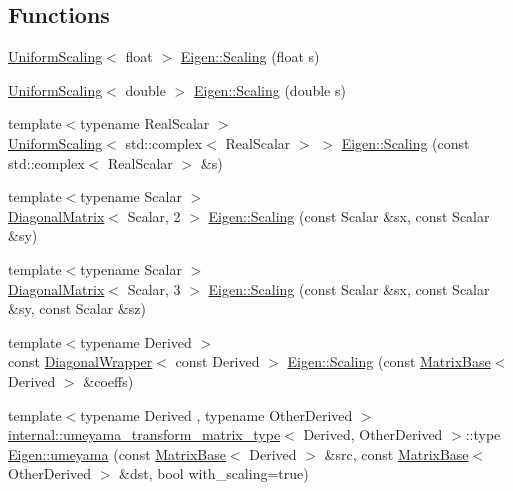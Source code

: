 \subsection*{Functions}
\begin{DoxyCompactItemize}
\item 
\mbox{\hyperlink{class_eigen_1_1_uniform_scaling}{Uniform\+Scaling}}$<$ float $>$ \mbox{\hyperlink{group___geometry___module_ga02918175ff75e5df9fd291cf5fc3fd1b}{Eigen\+::\+Scaling}} (float s)
\item 
\mbox{\hyperlink{class_eigen_1_1_uniform_scaling}{Uniform\+Scaling}}$<$ double $>$ \mbox{\hyperlink{group___geometry___module_gad2e71727718ca788680b3aa9eb485f98}{Eigen\+::\+Scaling}} (double s)
\item 
{\footnotesize template$<$typename Real\+Scalar $>$ }\\\mbox{\hyperlink{class_eigen_1_1_uniform_scaling}{Uniform\+Scaling}}$<$ std\+::complex$<$ Real\+Scalar $>$ $>$ \mbox{\hyperlink{group___geometry___module_ga76386154f2cdb77190759744830422d1}{Eigen\+::\+Scaling}} (const std\+::complex$<$ Real\+Scalar $>$ \&s)
\item 
{\footnotesize template$<$typename Scalar $>$ }\\\mbox{\hyperlink{class_eigen_1_1_diagonal_matrix}{Diagonal\+Matrix}}$<$ Scalar, 2 $>$ \mbox{\hyperlink{group___geometry___module_gaafd4d881e7a6c2a68c1db03e261c767b}{Eigen\+::\+Scaling}} (const Scalar \&sx, const Scalar \&sy)
\item 
{\footnotesize template$<$typename Scalar $>$ }\\\mbox{\hyperlink{class_eigen_1_1_diagonal_matrix}{Diagonal\+Matrix}}$<$ Scalar, 3 $>$ \mbox{\hyperlink{group___geometry___module_ga162d759175d7c5214f33fefb30862815}{Eigen\+::\+Scaling}} (const Scalar \&sx, const Scalar \&sy, const Scalar \&sz)
\item 
{\footnotesize template$<$typename Derived $>$ }\\const \mbox{\hyperlink{class_eigen_1_1_diagonal_wrapper}{Diagonal\+Wrapper}}$<$ const Derived $>$ \mbox{\hyperlink{group___geometry___module_ga109425bca2048c3df19249c04e73715c}{Eigen\+::\+Scaling}} (const \mbox{\hyperlink{class_eigen_1_1_matrix_base}{Matrix\+Base}}$<$ Derived $>$ \&coeffs)
\item 
{\footnotesize template$<$typename Derived , typename Other\+Derived $>$ }\\\mbox{\hyperlink{struct_eigen_1_1internal_1_1umeyama__transform__matrix__type}{internal\+::umeyama\+\_\+transform\+\_\+matrix\+\_\+type}}$<$ Derived, Other\+Derived $>$\+::type \mbox{\hyperlink{group___geometry___module_gab3f5a82a24490b936f8694cf8fef8e60}{Eigen\+::umeyama}} (const \mbox{\hyperlink{class_eigen_1_1_matrix_base}{Matrix\+Base}}$<$ Derived $>$ \&src, const \mbox{\hyperlink{class_eigen_1_1_matrix_base}{Matrix\+Base}}$<$ Other\+Derived $>$ \&dst, bool with\+\_\+scaling=true)

\end{DoxyCompactItemize}
